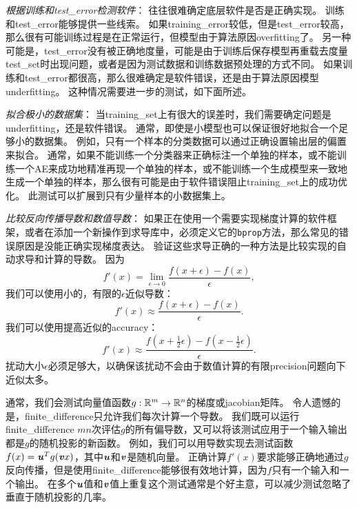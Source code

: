 \emph{根据训练和\gls{test_error}检测软件}：
往往很难确定底层软件是否是正确实现。
训练和\gls{test_error}能够提供一些线索。
如果\gls{training_error}较低，但是\gls{test_error}较高，那么很有可能训练过程是在正常运行，但模型由于算法原因\gls{overfitting}了。
另一种可能是，\gls{test_error}没有被正确地度量，可能是由于训练后保存模型再重载去度量\gls{test_set}时出现问题，或者是因为测试数据和训练数据预处理的方式不同。
如果训练和\gls{test_error}都很高，那么很难确定是软件错误，还是由于算法原因模型\gls{underfitting}。
这种情况需要进一步的测试，如下面所述。


\emph{拟合极小的数据集}：
当\gls{training_set}上有很大的误差时，我们需要确定问题是\gls{underfitting}，还是软件错误。
通常，即使是小模型也可以保证很好地拟合一个足够小的数据集。
例如，只有一个样本的分类数据可以通过正确设置输出层的偏置来拟合。
通常，如果不能训练一个分类器来正确标注一个单独的样本，或不能训练一个\gls{AE}来成功地精准再现一个单独的样本，或不能训练一个生成模型来一致地生成一个单独的样本，那么很有可能是由于软件错误阻止\gls{training_set}上的成功优化。
此测试可以扩展到只有少量样本的小数据集上。


\emph{比较反向传播导数和数值导数}：
如果正在使用一个需要实现梯度计算的软件框架，或者在添加一个新操作到求导库中，必须定义它的\texttt{bprop}方法，那么常见的错误原因是没能正确实现梯度表达。
验证这些求导正确的一种方法是比较实现的自动求导和计算的导数。
因为
\begin{equation}
	f'(x) = \lim_{\epsilon \to 0} \frac{f(x+\epsilon) - f(x)}{\epsilon},
\end{equation}
我们可以使用小的，有限的$\epsilon$近似导数：
\begin{equation}
	f'(x) \approx \frac{f(x+\epsilon) - f(x)}{\epsilon}.
\end{equation}
我们可以使用提高近似的\gls{accuracy}：
\begin{equation}
	f'(x) \approx \frac{ f(x+\frac{1}{2}\epsilon) - f(x-\frac{1}{2}\epsilon) }{\epsilon}.
\end{equation}
扰动大小$\epsilon$必须足够大，以确保该扰动不会由于数值计算的有限\gls{precision}问题向下近似太多。


通常，我们会测试向量值函数$g:\mathbb{R}^m \to \mathbb{R}^n$的梯度或\gls{jacobian}矩阵。
令人遗憾的是，\gls{finite_difference}只允许我们每次计算一个导数。
我们既可以运行\gls{finite_difference} $mn$次评估$g$的所有偏导数，又可以将该测试应用于一个输入输出都是$g$的随机投影的新函数。
例如，我们可以用导数实现去测试函数$f(x) = \boldsymbol{\mathit{u}}^T g(\boldsymbol{\mathit{v}} x)$，其中$\boldsymbol{\mathit{u}}$和$\boldsymbol{\mathit{v}}$是随机向量。
正确计算$f'(x)$要求能够正确地通过$g$反向传播，但是使用\gls{finite_difference}能够很有效地计算，因为$f$只有一个输入和一个输出。
在多个$\boldsymbol{\mathit{u}}$值和$\boldsymbol{\mathit{v}}$值上重复这个测试通常是个好主意，可以减少测试忽略了垂直于随机投影的几率。

